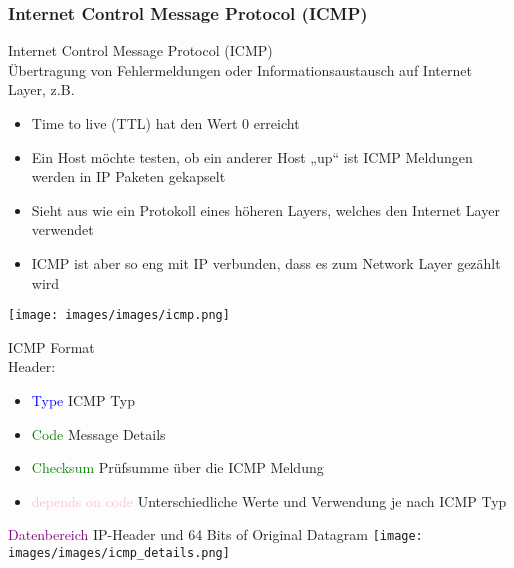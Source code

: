 \subsubsection{Internet Control Message Protocol (ICMP)}

\begin{concept}{Internet Control Message Protocol (ICMP)}\\
    Übertragung von Fehlermeldungen oder Informationsaustausch auf Internet Layer, z.B.
    \begin{itemize}
        \item Time to live (TTL) hat den Wert 0 erreicht
        \item Ein Host möchte testen, ob ein anderer Host „up“ ist ICMP Meldungen werden in IP Paketen gekapselt
        \item Sieht aus wie ein Protokoll eines höheren Layers, welches den Internet Layer verwendet
        \item ICMP ist aber so eng mit IP verbunden, dass es zum Network Layer gezählt wird
    \end{itemize}
        \texttt{[image: images/images/icmp.png]}
\end{concept}

\begin{KR}{ICMP Format}\\
    Header:
    \begin{itemize}
        \item \textcolor{blue}{Type} ICMP Typ
        \item \textcolor{green}{Code} Message Details
        \item \textcolor{green}{Checksum} Prüfsumme über die ICMP Meldung
        \item \textcolor{pink}{depends on code} Unterschiedliche Werte und Verwendung je nach ICMP Typ
    \end{itemize}
    \textcolor{purple}{Datenbereich} IP-Header und 64 Bits of Original Datagram
    \texttt{[image: images/images/icmp\_details.png]}
\end{KR}

